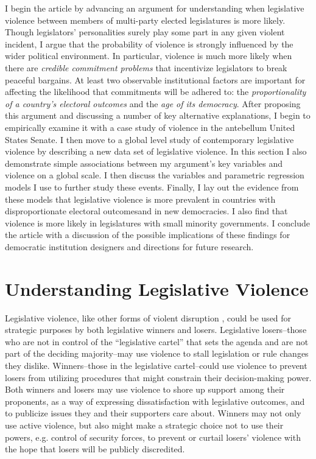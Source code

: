 \documentclass[a4paper]{article}\usepackage[]{graphicx}\usepackage[]{color}
\begin{document}
I begin the article by advancing an argument for understanding when legislative violence between members of multi-party elected legislatures is more likely. Though legislators' personalities surely play some part in any given violent incident, I argue that the probability of violence is strongly influenced by the wider political environment. In particular, violence is much more likely when there are \emph{credible commitment problems} that incentivize legislators to break peaceful bargains. At least two observable institutional factors are important for affecting the likelihood that commitments will be adhered to: the \emph{proportionality of a country's electoral outcomes} and the \emph{age of its democracy}. After proposing this argument and discussing a number of key alternative explanations, I begin to empirically examine it with a case study of violence in the antebellum United States Senate. I then move to a global level study of contemporary legislative violence by describing a new data set of legislative violence. In this section I also demonstrate simple associations between my argument's key variables and violence on a global scale. I then discuss the variables and parametric regression models I use to further study these events. Finally, I lay out the evidence from these models that legislative violence is more prevalent in countries with disproportionate electoral outcomesand in new democracies. I also find that violence is more likely in legislatures with small minority governments. I conclude the article with a discussion of the possible implications of these findings for democratic institution designers and directions for future research.


\section{Understanding Legislative Violence}

Legislative violence, like other forms of violent disruption \citep[]{Beaulieu2008,BeaulieuForthcoming,wilkinson2006}, could be used for strategic purposes by both legislative winners and losers. Legislative losers--those who are not in control of the ``legislative cartel''  that sets the agenda \citep{cox2007} and are not part of the deciding majority--may use violence to stall legislation or rule changes they dislike. Winners--those in the legislative cartel--could use violence to prevent losers from utilizing procedures that might constrain their decision-making power. Both winners and losers may use violence to shore up support among their proponents, as a way of expressing dissatisfaction with legislative outcomes, and to publicize issues they and their supporters care about. Winners may not only use active violence, but also might make a strategic choice not to use their powers, e.g. control of security forces, to prevent or curtail losers' violence with the hope that losers will be publicly discredited.
\end{document}
